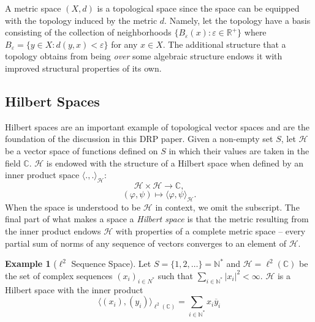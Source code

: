 \documentclass{article}
\theoremstyle{definition}
\newtheorem{exmp}[thm]{Example}
\theoremstyle{remark}
\numberwithin{equation}{section}
\begin{document}
A metric space $(X, d)$ is a topological space since the space can be equipped with the topology induced by the metric $d$. Namely, let the topology have a basis consisting of the collection of neighborhoods $\{ B_{\varepsilon} (x) : \varepsilon \in \mathbb{R}^+ \}$ where $B_{\varepsilon} = \{ y \in X : d(y,x) < \varepsilon \}$ for any $x \in X$. The additional structure that a topology obtains from being \textit{over} some algebraic structure endows it with improved structural properties of its own. 

\subsection{Hilbert Spaces}
Hilbert spaces are an important example of topological vector spaces and are the foundation of the discussion in this DRP paper. Given a non-empty set $S$, let $\mathcal{H}$ be a vector space of functions defined on $S$ in which their values are taken in the field $\mathbb{C}$. $\mathcal{H}$ is endowed with the structure of a Hilbert space when defined by an inner product space $\langle . , . \rangle _{\mathcal{H}}:$
$$\mathcal{H} \times \mathcal{H} \rightarrow \mathbb{C},$$
$$(\varphi, \psi ) \mapsto \langle \varphi, \psi \rangle _{\mathcal{H}}. $$
When the space is understood to be $\mathcal{H}$ in context, we omit the subscript. The final part of what makes a space a \textit{Hilbert space} is that the metric resulting from the inner product endows $\mathcal{H}$ with properties of a complete metric space -- every partial sum of norms of any sequence of vectors converges to an element of $\mathcal{H}$. 

\begin{exmp}[$\ell^2$ Sequence Space]
Let $S = \{ 1, 2, \dots \} = \mathbb{N}^*$ and $\mathcal{H} = \ell ^2 (\mathbb{C})$ be the set of complex sequences $(x_i)_{i \in N^*}$ such that $\sum _{i \in \mathbb{N}^*} |x_i|^2 < \infty.$ $\mathcal{H}$ is a Hilbert space with the inner product 
$$\langle (x_i), (y_i) \rangle _{\ell ^2 (\mathbb{C})} = \sum _{i \in \mathbb{N}^*} x_i \overline{y} _i $$
\end{exmp}
\end{document}
